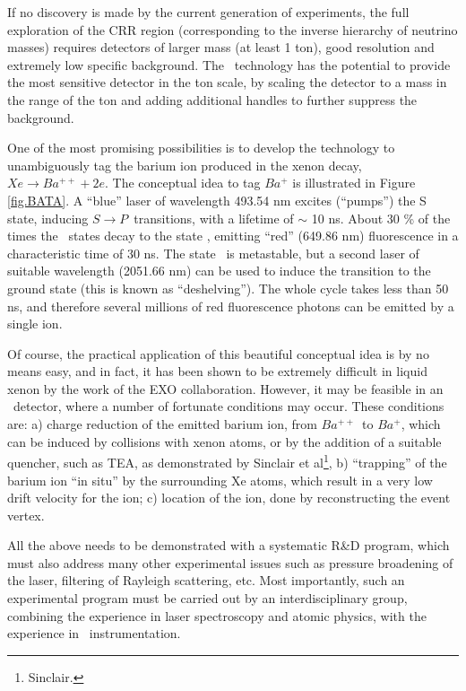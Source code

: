 If no discovery is made by the current generation of experiments, the full exploration of the CRR region (corresponding to the inverse hierarchy of neutrino masses) requires detectors of larger mass (at least 1 ton), good resolution and extremely low specific background. The \HPXE\ technology has the potential to provide the most sensitive detector in the ton scale, by scaling the detector to a mass in the range of the ton and adding additional handles to further suppress the background. 

One of the most promising possibilities is to develop the technology to unambiguously tag the barium ion produced in the xenon decay, $Xe \rightarrow Ba^{++} + 2 e$. The conceptual idea to tag $Ba^{+}$ is illustrated in Figure \ref{fig.BATA}. A ``blue'' laser of wavelength 493.54 nm excites (``pumps'') the S state, inducing $S \rightarrow P$~transitions, with a lifetime of $\sim$ 10 ns. About 30 \% of the times the \TwoP\ states decay to the state \TwoD, emitting ``red'' (649.86 nm) fluorescence in a characteristic time of 30 ns. The state \TwoD\ is metastable, but a second laser of suitable wavelength (2051.66 nm) can be used to induce the transition to the ground state (this is known as ``deshelving'').  The whole cycle takes less than 50 ns, and therefore several millions of red fluorescence photons can be emitted by a single ion. 

Of course, the practical application of this beautiful conceptual idea is by no means easy, and in fact, it has been shown to be extremely difficult in liquid xenon by the work of the EXO collaboration. However, it may be feasible in an \HPXE\ detector, where a number of fortunate conditions may occur. These conditions are: a) charge reduction of the emitted barium ion, from $Ba^{++}$~to $Ba^{+}$, which can be induced by collisions with xenon atoms, or by the addition of a suitable quencher, such as TEA, as demonstrated by Sinclair et al\footnote{Sinclair.}, b) ``trapping'' of the barium ion ``in situ'' by the surrounding Xe atoms, which result in a very low drift velocity for the ion; c) location of the ion, done by reconstructing the event vertex. 

All the above needs to be demonstrated with a systematic R\&D program, which must also address many other experimental issues such as pressure broadening of the laser, filtering of Rayleigh scattering, etc. Most importantly, such an experimental program must be carried out by an interdisciplinary group, combining the experience in laser spectroscopy and atomic physics, with the experience in \HPXE\ instrumentation.


